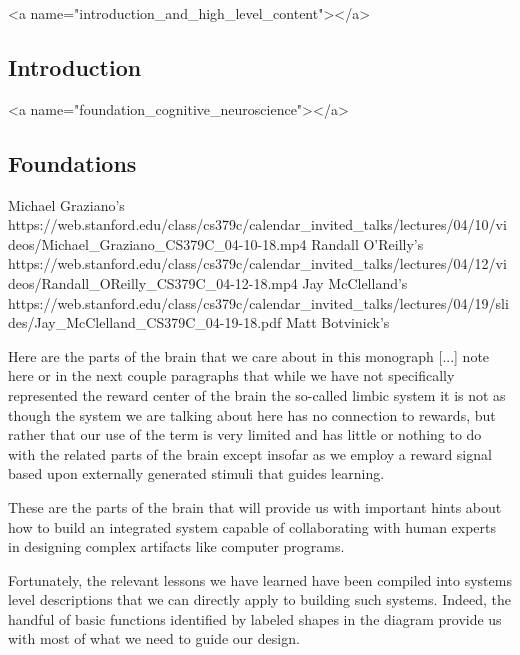 
\rawhtml
<a name="introduction_and_high_level_content"></a>
\endrawhtml
\subsection*{Introduction}



\rawhtml
<a name="foundation_cognitive_neuroscience"></a>
\endrawhtml
\subsection*{Foundations}

Michael Graziano's
https://web.stanford.edu/class/cs379c/calendar_invited_talks/lectures/04/10/videos/Michael_Graziano_CS379C_04-10-18.mp4
Randall O'Reilly's
https://web.stanford.edu/class/cs379c/calendar_invited_talks/lectures/04/12/videos/Randall_OReilly_CS379C_04-12-18.mp4
Jay McClelland's
https://web.stanford.edu/class/cs379c/calendar_invited_talks/lectures/04/19/slides/Jay_McClelland_CS379C_04-19-18.pdf
Matt Botvinick's


Here are the parts of the brain that we care about in this monograph [...] note here or in the next couple paragraphs that while we have not specifically represented the reward center of the brain \emdash{} the so-called limbic system \emdash{} it is not as though the system we are talking about here has no connection to rewards, but rather that our use of the term is very limited and has little or nothing to do with the related parts of the brain except insofar as we employ a reward signal based upon externally generated stimuli that guides learning.

These are the parts of the brain that will provide us with important hints about how to build an integrated system capable of collaborating with human experts in designing complex artifacts like computer programs.

Fortunately, the relevant lessons we have learned have been compiled into systems level descriptions that we can directly apply to building such systems. Indeed, the handful of basic functions identified by labeled shapes in the diagram provide us with most of what we need to guide our design.

